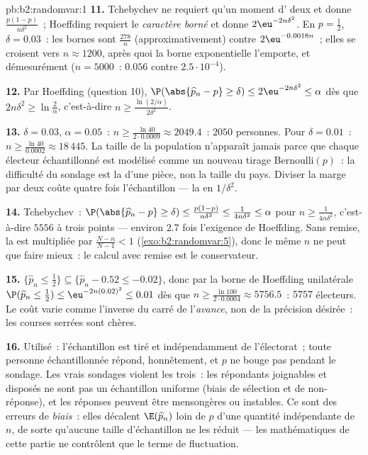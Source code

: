 \begin{solution}{pb:b2:randomvar:1}
\textbf{11.} Tchebychev ne requiert qu'un moment d' deux et donne
$\frac{p(1-p)}{n\delta^2}$~; Hoeffding requiert le
\emph{caractère borné} et donne $2\eu^{-2n\delta^2}$. En $p =
\frac12$, $\delta = 0.03$~: les bornes sont
$\frac{278}{n}$ (approximativement) contre
$2\eu^{-0.0018n}$~; elles se croisent vers $n \approx 1200$, après
quoi la borne exponentielle l'emporte, et démesurément ($n = 5000$~:
$0.056$ contre $2.5\cdot10^{-4}$).

\textbf{12.} Par Hoeffding (question 10), $\P(\abs{\widehat
p_n - p} \geq \delta) \leq 2\eu^{-2n\delta^2} \leq \alpha$ dès
que $2n\delta^2 \geq \ln\frac2\alpha$, c'est-à-dire $n \geq
\frac{\ln(2/\alpha)}{2\delta^2}$.

\textbf{13.} $\delta = 0.03$, $\alpha = 0.05$~: $n \geq
\frac{\ln 40}{2\cdot0.0009} \approx 2049.4$~: $2050$ personnes.
Pour $\delta = 0.01$~: $n \geq \frac{\ln40}{0.0002} \approx
18\,445$. La taille de la population n'apparaît jamais parce que chaque
électeur échantillonné est modélisé comme un nouveau tirage Bernoulli$(p)$~: la
difficulté du sondage est la  d'une pièce, non la taille
du pays. Diviser la marge par deux coûte quatre fois l'échantillon
--- la  en $1/\delta^2$.

\textbf{14.} Tchebychev~: $\P(\abs{\widehat p_n - p} \geq
\delta) \leq \frac{p(1-p)}{n\delta^2} \leq
\frac1{4n\delta^2} \leq \alpha$ pour $n \geq
\frac1{4\alpha\delta^2}$, c'est-à-dire $5556$ à trois points ---
environ $2.7$ fois l'exigence de Hoeffding. Sans
remise, la  est multipliée par $\frac{N -
n}{N-1} < 1$ (\cref{exo:b2:randomvar:5}), donc le même $n$ ne
peut que faire mieux~: le calcul avec remise est le
conservateur.

\textbf{15.} $\{\widehat p_n \leq \frac12\} \subseteq
\{\widehat p_n - 0.52 \leq -0.02\}$, donc par la borne de Hoeffding
unilatérale $\P(\widehat p_n \leq \tfrac12) \leq
\eu^{-2n(0.02)^2} \leq 0.01$ dès que $n \geq \frac{\ln
100}{2\cdot0.0004} \approx 5756.5$~: $5757$ électeurs. Le coût
varie comme l'inverse du carré de l'\emph{avance}, non de la
précision désirée~: les courses serrées sont chères.

\textbf{16.} Utilisé~: l'échantillon est tiré  et
indépendamment de l'électorat~; toute personne échantillonnée
répond, honnêtement, et $p$ ne bouge pas pendant le sondage. Les vrais
sondages violent les trois~: les répondants joignables et disposés
ne sont pas un échantillon uniforme (biais de sélection et de non-réponse),
et les réponses peuvent être mensongères ou instables. Ce sont des
erreurs de \emph{biais}~: elles décalent $\E(\widehat p_n)$ loin de
$p$ d'une quantité indépendante de $n$, de sorte qu'aucune taille
d'échantillon ne les réduit --- les mathématiques de cette partie ne contrôlent que
le terme de fluctuation.


\end{solution}
